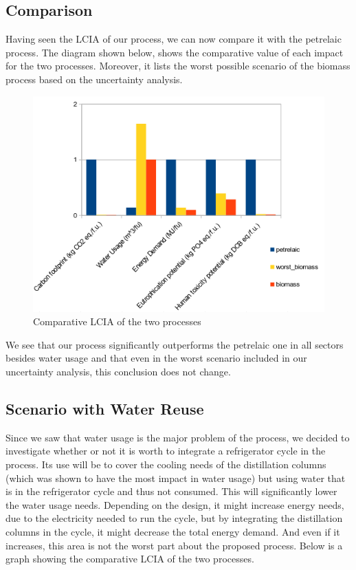 \documentclass[11pt]{article}
\begin{document}
\pagebreak

\subsection{Comparison}
\label{sec:orga0be043}
Having seen the LCIA of our process, we can now compare it with the petrelaic process. The diagram shown below, shows the comparative value of each impact for the two processes. Moreover, it lists the worst possible scenario of the biomass process based on the uncertainty analysis.

\begin{figure}[htbp]
\centering
\includegraphics[width=.6\linewidth]{Life_Cycle_Impact_Assessment/2024-01-06_16-23-27_screenshot.png}
\caption{Comparative LCIA of the two processes}
\end{figure}

\pagebreak

We see that our process significantly outperforms the petrelaic one in all sectors besides water usage and that even in the worst scenario included in our uncertainty analysis, this conclusion does not change.

\subsection{Scenario with Water Reuse}
\label{sec:orgf0af253}
Since we saw that water usage is the major problem of the process, we decided to investigate whether or not it is worth to integrate a refrigerator cycle in the process. Its use will be to cover the cooling needs of the distillation columns (which was shown to have the most impact in water usage) but using water that is in the refrigerator cycle and thus not consumed. This will significantly lower the water usage needs. Depending on the design, it might increase energy needs, due to the electricity needed to run the cycle, but by integrating the distillation columns in the cycle, it might decrease the total energy demand. And even if it increases, this area is not the worst part about the proposed process. Below is a graph showing the comparative LCIA of the two processes.
\end{document}
